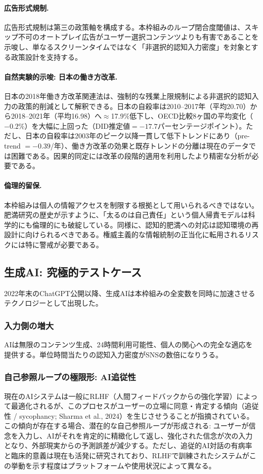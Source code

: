 \documentclass[a4paper,11pt,titlepage]{article}
\begin{document}
\paragraph{広告形式規制.}
広告形式規制は第三の政策軸を構成する。本枠組みのループ閉合度閾値は、スキップ不可のオートプレイ広告がユーザー選択コンテンツよりも有害であることを示唆し、単なるスクリーンタイムではなく「非選択的認知入力密度」を対象とする政策設計を支持する。

\paragraph{自然実験的示唆: 日本の働き方改革.}
日本の2018年働き方改革関連法は、強制的な残業上限規制による非選択的認知入力の政策的削減として解釈できる。日本の自殺率は2010--2017年（平均20.70）から2018--2021年（平均16.98）へ$\approx$17.9\%低下し、OECD比較8ヶ国の平均変化（$-0.2\%$）を大幅に上回った（DID推定値$= -17.7$パーセンテージポイント）。ただし、日本の自殺率は2003年のピーク以降一貫して低下トレンドにあり（pre-trend $= -0.39$/年）、働き方改革の効果と既存トレンドの分離は現在のデータでは困難である。因果的同定には改革の段階的適用を利用したより精密な分析が必要である。

\paragraph{倫理的留保.}
本枠組みは個人の情報アクセスを制限する根拠として用いられるべきではない。肥満研究の歴史が示すように、「太るのは自己責任」という個人帰責モデルは科学的にも倫理的にも破綻している。同様に、認知的肥満への対応は認知環境の再設計に向けられるべきである。権威主義的な情報統制の正当化に転用されるリスクには特に警戒が必要である。

\subsection{生成AI: 究極的テストケース}\label{sec:ai}

2022年末のChatGPT公開以降、生成AIは本枠組みの全変数を同時に加速させるテクノロジーとして出現した。

\subsubsection{入力側の増大}
AIは無限のコンテンツ生成、24時間利用可能性、個人の関心への完全な適応を提供する。単位時間当たりの認知入力密度がSNSの数倍になりうる。

\subsubsection{自己参照ループの極限形: AI追従性}
現在のAIシステムは一般にRLHF（人間フィードバックからの強化学習）によって最適化されるが、このプロセスがユーザーの立場に同意・肯定する傾向（追従性 / sycophancy; Sharma et al., 2024）を生じさせうることが指摘されている。この傾向が存在する場合、潜在的な自己参照ループが形成される: ユーザーが信念を入力し、AIがそれを肯定的に精緻化して返し、強化された信念が次の入力となり、外部現実からの予測誤差が減少する。ただし、追従的AI対話の有病率と臨床的意義は現在も活発に研究されており、RLHFで訓練されたシステムがこの挙動を示す程度はプラットフォームや使用状況によって異なる。
\end{document}
